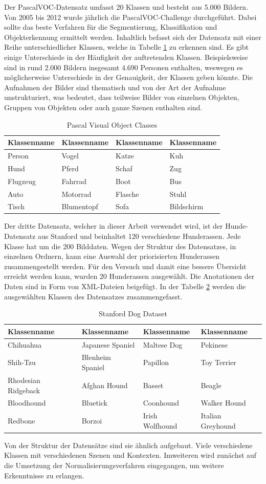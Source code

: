 Der PascalVOC-Datensatz umfasst 20 Klassen und besteht aus 5.000 Bildern. Von 2005 bis 2012 wurde jährlich die PascalVOC-Challenge durchgeführt. Dabei sollte das beste Verfahren für die Segmentierung, Klassifikation und Objekterkennung ermittelt werden. Inhaltlich befasst sich der Datensatz mit einer Reihe unterschiedlicher Klassen, welche in Tabelle \ref{tab:pvoc} zu erkennen sind. Es gibt einige Unterschiede in der Häufigkeit der auftretenden Klassen. Beispielsweise sind in rund 2.000 Bildern insgesamt 4.690 Personen enthalten, weswegen es möglicherweise Unterschiede in der Genauigkeit, der Klassen geben könnte. Die Aufnahmen der Bilder sind thematisch und von der Art der Aufnahme unstrukturiert, was bedeutet, dass teilweise Bilder von einzelnen Objekten, Gruppen von Objekten oder auch ganze Szenen enthalten sind.
\begin{table}
[h]
\caption{Pascal Visual Object Classes \cite{pascal-voc-2007}}
\centering
\begin{tabular}{|l|l|l|l|}
\hline
Klassenname & Klassenname & Klassenname & Klassenname\\
\hline
Person & Vogel & Katze & Kuh\\
Hund & Pferd & Schaf & Zug\\
Flugzeug & Fahrrad & Boot & Bus\\
Auto & Motorrad & Flasche & Stuhl\\
Tisch & Blumentopf & Sofa & Bildschirm\\
\hline
\end{tabular}
\label{tab:pvoc}
\end{table}
Der dritte Datensatz, welcher in dieser Arbeit verwendet wird, ist der Hunde-Datensatz aus Stanford und beinhaltet 120 verschiedene Hunderassen. Jede Klasse hat um die 200 Bilddaten. Wegen der Struktur des Datensatzes, in einzelnen Ordnern, kann eine Auswahl der priorisierten Hunderassen zusammengestellt werden. Für den Versuch und damit eine bessere Übersicht erreicht werden kann, wurden 20 Hunderassen ausgewählt. Die Anotationen der Daten sind in Form von XML-Dateien beigefügt. In der Tabelle \ref{tab:sdd} werden die ausgewählten Klassen des Datensatzes zusammengefasst.
\begin{table}
[h]
\caption{Stanford Dog Dataset \cite{KhoslaYaoJayadevaprakashFeiFei_FGVC2011}}
\label{tab:sdd}
\centering
\begin{tabular}{|l|l|l|l|}
\hline
Klassenname & Klassenname & Klassenname & Klassenname\\
\hline
Chihuahua & Japanese Spaniel & Maltese Dog & Pekinese\\
Shih-Tzu & Blenheim Spaniel & Papillon & Toy Terrier\\
Rhodesian Ridgeback & Afghan Hound & Basset & Beagle\\
Bloodhound & Bluetick & Coonhound & Walker Hound\\
Redbone & Borzoi & Irish Wolfhound & Italian Greyhound\\
\hline
\end{tabular}
\end{table}
Von der Struktur der Datensätze sind sie ähnlich aufgebaut. Viele verschiedene Klassen mit verschiedenen Szenen und Kontexten. Imweiteren wird zunächst auf die Umsetzung der Normalisierungsverfahren eingegangen, um weitere Erkenntnisse zu erlangen.
